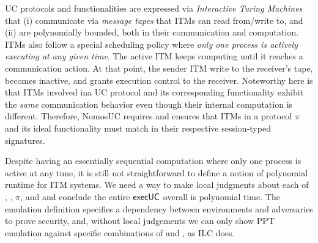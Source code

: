 UC protocols and functionalities are expressed via \emph{Interactive Turing Machines} that
(i) communicate via \emph{message tapes} that ITMs can read from/write to,
and (ii) are polynomially bounded, both in their communication and computation.
ITMs also follow a special scheduling policy where \emph{only one process is actively executing at any given time}.
The active ITM keeps computing until it reaches a communication action.
At that point, the sender ITM write to the receiver's tape, becomes inactive, and grants
execution control to the receiver.
Noteworthy here is that ITMs involved ina UC protocol and its corresponding functionality exhibit the
\emph{same} communication behavior even though their internal computation is different.
Therefore, NomosUC requires and ensures that ITMs in a protocol $\pi$ and its ideal functionality \F must match
in their respective session-typed signatures.

Despite having an essentially sequential computation where only one process is active at any time,
it is still not straightforward to define a notion of polynomial runtime for ITM systems.
We need a way to make local judgments about each of \A, \Z, $\pi$, and \F and conclude the entire ${\mathsf {execUC}}$ overall is polynomial time. 
The emulation definition specifies a dependency between environments and adversaries to prove security,
and, without local judgements we can only show PPT emulation against specific combinations of \Z and \A, as ILC does.


